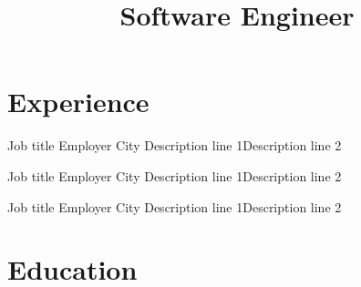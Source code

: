 \documentclass[11pt,a4paper,sans]{moderncv}
\title{Software Engineer}
\begin{document}
\makecvtitle

\section{Experience}

{Job title}
{Employer}
{City}
{}
{Description line 1\newline{}Description line 2}

{Job title}
{Employer}
{City}
{}
{Description line 1\newline{}Description line 2}

{Job title}
{Employer}
{City}
{}
{Description line 1\newline{}Description line 2}

\section{Education}
\end{document}
